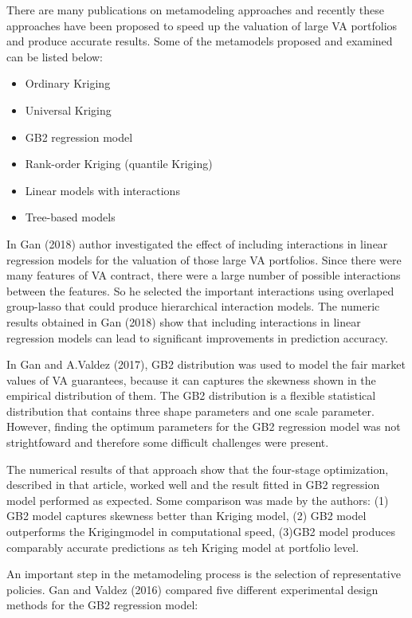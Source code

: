 There are many publications on metamodeling approaches and recently these approaches have been proposed to speed up the valuation of large VA portfolios and produce accurate results. Some of the metamodels proposed and examined can be listed below:

\begin{itemize}
\item Ordinary Kriging
\item Universal Kriging
\item GB2 regression model
\item Rank-order Kriging (quantile Kriging)
\item Linear models with interactions
\item Tree-based models 
\end{itemize} 


In Gan (2018) author investigated the effect of including interactions in linear regression models for the valuation of those large VA portfolios. Since there were many features of VA contract, there were a large number of possible interactions between the features. So he selected the important interactions using overlaped group-lasso that could produce hierarchical interaction models. The numeric results obtained in Gan (2018) show that including interactions in linear regression models can lead to significant improvements in prediction accuracy. 

In Gan and A.Valdez (2017), GB2 distribution was used to model the fair market values of VA guarantees, because it can captures the skewness shown in the empirical distribution of them. The GB2 distribution is a flexible statistical distribution that contains three shape parameters and one scale parameter. However, finding the optimum parameters for the GB2 regression model was not strightfoward and therefore some difficult challenges were present. 

The numerical results of that approach show that the four-stage optimization, described in that article, worked well and the result fitted in GB2 regression model performed as expected. Some comparison was made by the authors: (1) GB2 model captures skewness better than Kriging model, (2) GB2 model outperforms the Krigingmodel in computational speed, (3)GB2 model produces comparably accurate predictions as teh Kriging model at portfolio level.

An important step in the metamodeling process is the selection of representative policies. Gan and Valdez (2016) compared five different experimental design methods for the GB2 regression model:

